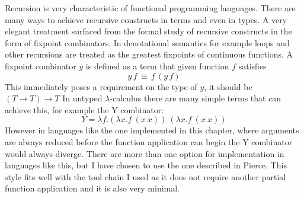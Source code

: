 \documentclass[12pt,twoside,notitlepage]{report}
\begin{document}
Recursion is very characteristic of functional programming languages. There are many ways to achieve recursive constructs in terms and even in types. A very elegant treatment surfaced from the formal study of recursive constructs in the form of fixpoint combinators. In denotational semantics for example loops and other recursions are treated as the greatest fixpoints of continuous functions. A fixpoint combinator $ y $ is defined as a term that given function $ f $ satisfies
\[ y\,f\,\equiv\, f\,(y\,f) \] 
This immediately poses a requirement on the type of $ y $, it should be $ (T \rightarrow T) \rightarrow T $
In untyped $ \lambda $-calculus there are many simple terms that can achieve this, for example the Y combinator:
\[ Y = \lambda f.(\lambda x.f\ (x\ x))\ (\lambda x.f\ (x\ x))  \]
However in languages like the one implemented in this chapter, where arguments are always reduced before the function application can begin the Y combinator would always diverge. There are more than one option for implementation in languages like this, but I have chosen to use the one described in Pierce\cite[p.~144]{pierce2002types}. This style fits well with the tool chain I used as it does not require another partial function application and it is also very minimal.
\end{document}
